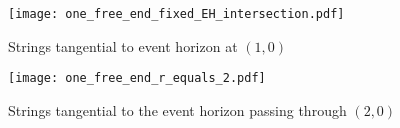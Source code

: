 \documentclass[prb,preprint]{revtex4-1}
\begin{document}
\begin{figure}[p] %
\centering
\texttt{[image: one\_free\_end\_fixed\_EH\_intersection.pdf]}
\caption{Strings tangential to event horizon at $(1,0)$}
\label{fixed_EH_intersection}
\end{figure}

\begin{figure}[p] %
\centering
\texttt{[image: one\_free\_end\_r\_equals\_2.pdf]}
\caption{Strings tangential to the event horizon passing through $(2,0)$}
\label{one_free_end_r_equals_2}
\end{figure}
\end{document}
